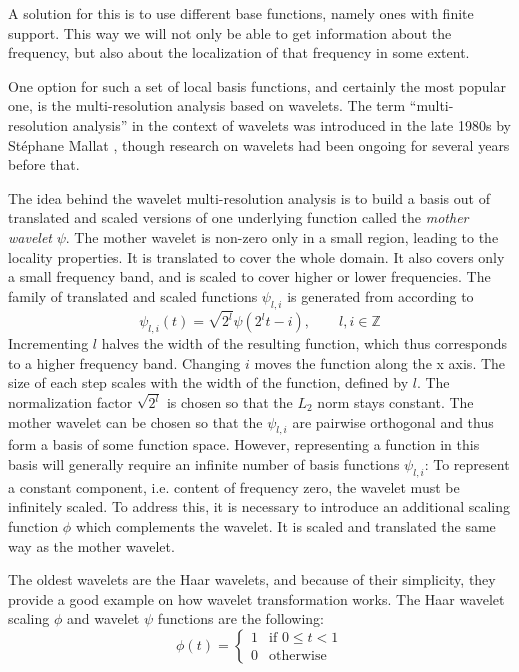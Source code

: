 \documentclass{diploma_style}
\begin{document}
A solution for this is to use different base functions, namely ones with finite support. This way we will not only be able to get information about the frequency, but also about the localization of that frequency in some extent.

One option for such a set of local basis functions, and certainly the most popular one, is the multi-resolution analysis based on wavelets. The term “multi-resolution analysis” in the context of wavelets was introduced in the late 1980s by Stéphane Mallat \cite{mallat_theory_1989}, though research on wavelets had been ongoing for several years before that.

The idea behind the wavelet multi-resolution analysis is to build a basis out of translated and scaled versions of one underlying function called the \textit{mother wavelet} $\psi$. The mother wavelet is non-zero only in a small region, leading to the locality properties. It is translated to cover the whole domain. It also covers only a small frequency band, and is scaled to cover higher or lower frequencies. The family of translated and scaled functions $\psi_{l,i}$ is generated from   according to
\begin{equation}
\psi_{l,i}(t) = \sqrt{2^l} \psi \left(2^l t-i\right), \qquad l, i \in \mathbb{Z}
\end{equation}
Incrementing $l$ halves the width of the resulting function, which thus corresponds to a higher frequency band. Changing $i$ moves the function along the x axis. The size of each step scales with the width of the function, defined by $l$. The normalization factor $\sqrt{2^l}$ is chosen so that the $L_2$ norm stays constant. The mother wavelet can be chosen so that the $\psi_{l,i}$ are pairwise orthogonal and thus form a basis of some function space. However, representing a function in this basis will generally require an infinite number of basis functions $\psi_{l,i}$: To represent a constant component, i.e. content of frequency zero, the wavelet must be infinitely scaled. To address this, it is necessary to introduce an additional scaling function $\phi$ which complements the wavelet. It is scaled and translated the same way as the mother wavelet.

The oldest wavelets are the Haar wavelets, and because of their simplicity, they provide a good example on how wavelet transformation works. The Haar wavelet scaling $\phi$ and wavelet $\psi$ functions are the following:
\begin{equation}
\phi(t) = 
\begin{cases}
	1 & \text{if } 0 \leq t < 1 \\
	0 & \text{otherwise}
\end{cases}
\label{eq:scaling}
\end{equation}
\end{document}

